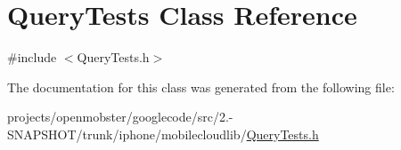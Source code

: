 \hypertarget{interface_query_tests}{
\section{\-Query\-Tests \-Class \-Reference}
\label{interface_query_tests}
}


{\ttfamily \#include $<$\-Query\-Tests.\-h$>$}



\-The documentation for this class was generated from the following file\-:\begin{DoxyCompactItemize}
\item 
projects/openmobster/googlecode/src/2.-\/\-S\-N\-A\-P\-S\-H\-O\-T/trunk/iphone/mobilecloudlib/\hyperlink{_query_tests_8h}{\-Query\-Tests.\-h}\end{DoxyCompactItemize}
